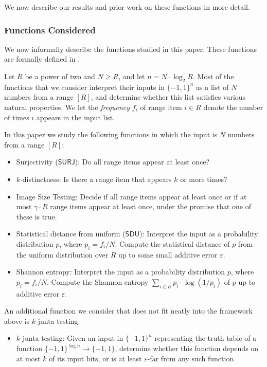 \documentclass[11pt, letterpaper, fleqn]{article}
\newenvironment{myitemize}
{ \begin{itemize}
    \setlength{\itemsep}{0pt}
    \setlength{\parskip}{0pt}
    \setlength{\parsep}{0pt}     }
{ \end{itemize}                  }
\theoremstyle{plain}
\newcommand{\SURJ}{\mathsf{ SURJ}}
\newcommand{\SDU}{\mathsf{ SDU}}
\newcommand{\bits}{\{-1,1\}}
\newcommand{\eps}{\varepsilon}
\begin{document}
We now describe our results and prior work on these functions in more detail.




\subsubsection{Functions Considered}
We now informally describe the functions studied in this paper. These functions are formally defined in .

Let $R$ be a power of two and $N \geq R$, and let $n=N \cdot \log_2 R$.
Most of the functions that we consider interpret their inputs in $\bits^n$ as a list of $N$ numbers from a range $[R]$, and determine whether this list satisfies various natural properties. 
We let the \emph{frequency} $f_i$ of range item $i \in R$ denote the number of times $i$ appears in the input list.

In this paper we study the following functions in which the input is $N$ numbers from a range $[R]$:
\begin{myitemize}
    \item Surjectivity ($\SURJ$): Do all range items appear at least once?
    \item $k$-distinctness: Is there a range item that appears $k$ or more times?
    \item Image Size Testing: Decide if all range items appear at least once or if at most $\gamma \cdot R$ range items appear at least once, under the promise that one of these is true.
    \item Statistical distance from uniform ($\SDU$): Interpret the input as a probability distribution $p$, where $p_i = f_i/N$. Compute the statistical distance of $p$ from the uniform distribution over $R$ up to some small additive error $\eps$.
    \item Shannon entropy: Interpret the input as a probability distribution $p$, where $p_i = f_i/N$. Compute the Shannon entropy $\sum_{i \in R} p_i \cdot \log(1/p_i)$ of $p$ up to additive error $\eps$.
\end{myitemize}
An additional function we consider that does not fit neatly into the framework above
is $k$-junta testing. 
\begin{myitemize}
    \item $k$-junta testing: Given an input in $\bits^n$ representing the truth table of a function $\bits^{\log n} \to \bits$, determine whether this function depends on at most $k$ of its input bits, or is at least $\eps$-far from any such function. 
\end{myitemize}
\end{document}
